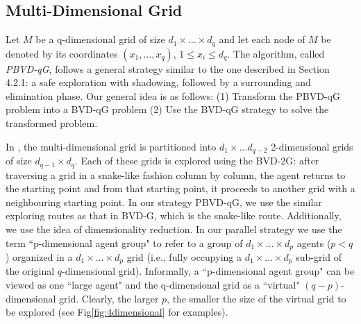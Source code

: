 \subsection{Multi-Dimensional Grid}
Let $M$ be a q-dimensional grid of size $d_1\times\ldots\times d_q$ and let each node of $M$ be denoted by its coordinates $(x_1,\ldots,x_q)$, $1\leq x_i\leq d_q$. The algorithm, called {\em PBVD-qG}, follows a general strategy similar to the one described in Section 4.2.1: a safe exploration with shadowing, followed by a surrounding and elimination phase. Our general idea is as follows: (1) Transform the PBVD-qG problem into a BVD-qG problem (2) Use the BVD-qG strategy to solve the transformed problem.

In \cite{Cai}, the multi-dimensional grid is partitioned into $d_1\times \ldots d_{q-2}$ 2-dimensional grids of size $d_{q-1} \times d_q$. Each of these grids is explored using the BVD-2G: after traversing a grid in a snake-like fashion column by column, the agent returns to the starting point and from that starting point, it proceeds to another grid with a neighbouring starting point. In our strategy PBVD-qG, we use the similar exploring routes as that in BVD-G, which is the snake-like route. Additionally, we use the idea of dimensionality reduction.
In our  parallel strategy   we use the term  ``p-dimensional  agent group" to 
refer to a group of $d_1\times \ldots \times d_p$ agents   ($p<q$) organized in a $d_1\times \ldots \times d_p$ grid (i.e.,   fully occupying  a $d_1\times \ldots \times d_p$ sub-grid of the original $q$-dimensional grid). 
Informally, a ``p-dimensional  agent group" 
can  be viewed as one  ``large agent" and  the  q-dimensional grid as a  ``virtual"  $(q-p)$-dimensional grid.
Clearly, the larger $p$, the smaller the size of the virtual grid to be explored (see Fig\ref{fig:4dimensional} for examples). 
%

